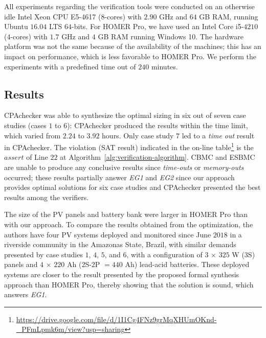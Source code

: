 \documentclass[runningheads]{llncs}
\begin{document}
All experiments regarding the verification tools were conducted on an otherwise idle Intel Xeon CPU E5-4617 ($8$-cores) with $2.90$ GHz and $64$ GB RAM, running Ubuntu $16.04$ LTS $64$-bits. For HOMER Pro, we have used an Intel Core i5-$4210$ ($4$-cores) with $1.7$ GHz and $4$ GB RAM running Windows 10. The hardware platform was not the same because of the availability of the machines; this has an impact on performance, which is less favorable to HOMER Pro. We perform the experiments with a predefined time out of $240$ minutes.

\subsection{Results}
CPAchecker was able to synthesize the optimal sizing in six out of seven case studies (cases $1$ to $6$): CPAchecker produced the results within the time limit, which varied from $2.24$ to $3.92$ hours. Only case study $7$ led to a \textit{time out} result in CPAchecker. The violation (SAT result) indicated in the on-line table\footnote{\url{https://drive.google.com/file/d/1I1Cg4FNz9grMqXHUmOKnd-\_PFmLpmk6m/view?usp=sharing}} is the $assert$ of Line $22$ at Algorithm~\ref{alg:verification-algorithm}. CBMC and ESBMC are unable to produce any conclusive results since \textit{time-outs} or \textit{memory-outs} occurred; these results partially answer \textit{EG1} and \textit{EG2} since our approach provides optimal solutions for six case studies and CPAchecker presented the best results among the verifiers. 

The size of the PV panels and battery bank were larger in HOMER Pro than with our approach. To compare the results obtained from the optimization, the authors have four PV systems deployed and monitored since June $2018$ in a riverside community in the Amazonas State, Brazil, with similar demands presented by case studies $1$, $4$, $5$, and $6$, with a configuration of $3$ $\times$ $325$ W ($3$S) panels and $4$ $\times$ $220$ Ah ($2$S-$2$P $= 440$ Ah) lead-acid batteries. These deployed systems are closer to the result presented by the proposed formal synthesis approach than HOMER Pro, thereby showing that the solution is sound, which answers \textit{EG1}.
\end{document}
